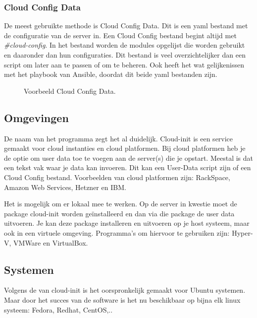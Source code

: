 \subsubsection{Cloud Config Data}
De meest gebruikte methode is Cloud Config Data. Dit is een yaml bestand met de configuratie van de server in. Een Cloud Config bestand begint altijd met \textit{\#cloud-config}. In het bestand worden de modules opgelijst die worden gebruikt en daaronder dan hun configuraties. Dit bestand is veel overzichtelijker dan een script om later aan te passen of om te beheren. Ook heeft het wat gelijkenissen met het playbook van Ansible, doordat dit beide yaml bestanden zijn.
\begin{figure}[!htb]
	\caption{Voorbeeld Cloud Config Data.}
	\label{fig:udatascript}
\end{figure}

\subsection{Omgevingen}
De naam van het programma zegt het al duidelijk. Cloud-init is een service gemaakt voor cloud instanties en cloud platformen. Bij cloud platformen heb je de optie om user data toe te voegen aan de server(s) die je opstart. Meestal is dat een tekst vak waar je data kan invoeren. Dit kan een User-Data script zijn of een Cloud Config bestand. Voorbeelden van cloud platformen zijn: RackSpace, Amazon Web Services, Hetzner en IBM. 

Het is mogelijk om er lokaal mee te werken. Op de server in kwestie moet de package cloud-init worden geïnstalleerd en dan via die package de user data uitvoeren. Je kan deze package installeren en uitvoeren op je host systeem, maar ook in een virtuele omgeving. Programma's om hiervoor te gebruiken zijn: Hyper-V, VMWare en VirtualBox.

\subsection{Systemen}
Volgens de van cloud-init \autocite{cloudsite} is het oorspronkelijk gemaakt voor Ubuntu systemen. Maar door het succes van de software is het nu beschikbaar op bijna elk linux systeem: Fedora, Redhat, CentOS,..


